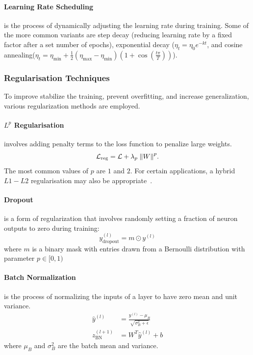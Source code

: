             
            
            \paragraph{Learning Rate Scheduling}is the process of dynamically adjusting the learning rate during training.
                Some of the more common variants are step decay (reducing learning rate by a fixed factor after a set number of epochs), exponential decay (\(\eta_t = \eta_0 e^{-kt}\), and cosine annealing(\(\eta_t = \eta_{\min} + \frac{1}{2}(\eta_{\max} - \eta_{\min})(1 + \cos(\frac{t\pi}{T}))\)).
        \subsubsection{Regularisation Techniques}
            To improve stabilize the training, prevent overfitting, and increase generalization, various regularization methods are employed.

            \paragraph{\(L^p\) Regularisation} involves adding penalty terms to the loss function to penalize large weights.
                \begin{equation}
                    \mathcal{L}_{\textrm{reg}} = \mathcal{L} + \lambda_p\;\norm{W}^p.
                \end{equation}
                The most common values of $p$ are $1$ and $2.$
                For certain applications, a hybrid $L1-L2$ regularisation may also be appropriate~\cite{shah_inverse_2016}.
            \paragraph{Dropout}is a form of regularization that involves randomly setting a fraction of neuron outputs to zero during training:
               \begin{equation}
                    y^{(l)}_{\text{dropout}} = m \odot y^{(l)}
               \end{equation}
               where \(m\) is a binary mask with entries drawn from a Bernoulli distribution with parameter $p\in [0, 1)$

            \paragraph{Batch Normalization} is the process of normalizing the inputs of a layer to have zero mean and unit variance.
                   \begin{align}
                   \hat{y}^{(l)} &= \frac{y^{(l)} - \mu_B}{\sqrt{\sigma_B^2 + \epsilon}} \\
                   z_{\text{BN}}^{(l+1)} &= W^T \hat{y}^{(l)} + b
                   \end{align}
                   where \(\mu_B\) and \(\sigma_B^2\) are the batch mean and variance.


